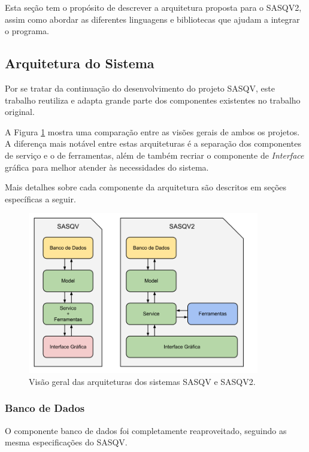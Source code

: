 Esta seção tem o propósito de descrever a arquitetura proposta para o SASQV2, assim como abordar as diferentes linguagens e bibliotecas que ajudam a integrar o programa.

\subsection{Arquitetura do Sistema}

Por se tratar da continuação do desenvolvimento do projeto SASQV, este trabalho reutiliza e adapta grande parte dos componentes existentes no trabalho original.

A Figura \ref{fig:arquitetura} mostra uma comparação entre as visões gerais de ambos os projetos. A diferença mais notável entre estas arquiteturas é a separação dos componentes de serviço e o de ferramentas, além de também recriar o componente de \emph{Interface} gráfica para melhor atender às necessidades do sistema.

Mais detalhes sobre cada componente da arquitetura são descritos em seções específicas a seguir.

\begin{figure}[!htb]
	\centering
	\includegraphics[width=0.9\textwidth]{./imgs/arquitetura.png}
	\caption{Visão geral das arquiteturas dos sistemas SASQV e SASQV2.}
	\label{fig:arquitetura}
\end{figure}

\subsubsection{Banco de Dados}

O componente banco de dados foi completamente reaproveitado, seguindo as mesma especificações do SASQV.

